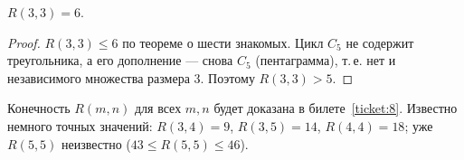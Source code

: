 \begin{cor}
\(R(3,3)=6\).
\end{cor}
\begin{proof}
\(R(3,3)\le6\) по теореме о шести знакомых. Цикл \(C_5\) не содержит треугольника,
а его дополнение — снова \(C_5\) (пентаграмма), т.\,е. нет и независимого множества
размера 3. Поэтому \(R(3,3)>5\).
\end{proof}

Конечность \(R(m,n)\) для всех \(m,n\) будет доказана в билете~\ref{ticket:8}.
Известно немного точных значений: \(R(3,4)=9\), \(R(3,5)=14\), \(R(4,4)=18\);
уже \(R(5,5)\) неизвестно (\(43\le R(5,5)\le46\)).
